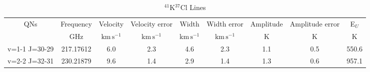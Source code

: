 \begin{table*}[htp]
\centering
\caption{$^{41}$K$^{37}$Cl Lines}
\begin{tabular}{ccccccccc}
\label{tab:41K37Cl_salt_lines}
QNs & Frequency & Velocity & Velocity error & Width & Width error & Amplitude & Amplitude error & E$_U$ \\
 & $\mathrm{GHz}$ & $\mathrm{km\,s^{-1}}$ & $\mathrm{km\,s^{-1}}$ & $\mathrm{km\,s^{-1}}$ & $\mathrm{km\,s^{-1}}$ & $\mathrm{K}$ & $\mathrm{K}$ & $\mathrm{K}$ \\
\hline
v=1-1 J=30-29 & 217.17612 & 6.0 & 2.3 & 4.6 & 2.3 & 1.1 & 0.5 & 550.6 \\
v=2-2 J=32-31 & 230.21879 & 9.6 & 1.4 & 2.9 & 1.4 & 1.3 & 0.6 & 957.1 \\
\hline
\end{tabular}

\par 
\end{table*}
